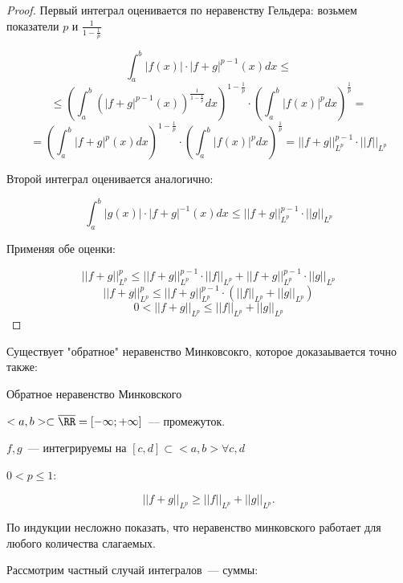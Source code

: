 \begin{proof}
    Первый интеграл оценивается по неравенству Гельдера: возьмем показатели $p$ и $\frac{1}{1 - \frac{1}{p}}$

    \[ 
    \int^b_a|f(x)|\cdot |f+g|^{p-1}(x) dx \le 
    \]
    \[
    \le \left(\int^b_a \left(|f+g|^{p-1}(x)\right)^{\frac{1}{1 - \frac{1}{p}}} dx \right)^{1-\frac{1}{p}}
    \cdot \left( \int^b_a |f(x)|^p dx \right)^{\frac{1}{p}} =
    \]
    \[
    = \left(\int^b_a |f+g|^p(x) dx \right)^{1-\frac{1}{p}}
    \cdot \left( \int^b_a |f(x)|^p dx \right)^{\frac{1}{p}} = ||f+g||^{p-1}_{L^p}\cdot ||f||_{L^p}
    \]

    Второй интеграл оценивается аналогично:

    \[ \int_a^b|g(x)|\cdot|f+g|^{-1}(x) dx \le ||f+g||_{L^p}^{p-1}\cdot||g||_{L^p}\]
    
    Применяя обе оценки:

    \[
    ||f+g||_{L^p}^p \le ||f+g||^{p-1}_{L^p}\cdot||f||_{L^p} + ||f+g||^{p-1}_{L^p}\cdot||g||_{L^p}
    \]
    \[
    ||f+g||_{L^p}^p \le ||f+g||_{L^p}^{p-1} \cdot (||f||_{L^p} + ||g||_{L^p})
    \]
    \[
     0 < ||f+g||_{L^p} \le ||f||_{L^p}+||g||_{L^p}
    \]

\end{proof}

\begin{remark}

    Существует "обратное" неравенство Минковсокго, которое доказаывается точно также:
\end{remark}

\begin{Proposition}{Обратное неравенство Минковского}{}

    $<a, b> \subset \overline{\RR} = [-\infty; +\infty]$~--- промежуток.

    $f, g$~--- интегрируемы на $[c, d] \subset <a, b> \forall c, d$

    $0 < p \le 1$:

    \[ ||f+g||_{L^p} \ge ||f||_{L^p} + ||g||_{L^p}. \]
\end{Proposition}

\begin{remark}
    По индукции несложно показать, что неравенство минковского работает для любого количества слагаемых.
\end{remark}

\vspace{2\baselineskip}
Рассмотрим частный случай интегралов~--- суммы:

